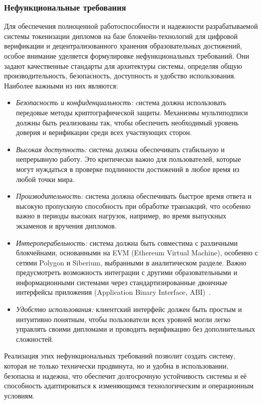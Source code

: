 \subsubsection{Нефункциональные требования}
\label{subsec:nonfunc_req}

Для обеспечения полноценной работоспособности и надежности разрабатываемой системы токенизации дипломов на базе блокчейн-технологий для цифровой верификации и децентрализованного хранения образовательных достижений, особое внимание уделяется формулировке нефункциональных требований. Они задают качественные стандарты для архитектуры системы, определяя общую производительность, безопасность, доступность и удобство использования. Наиболее важными из них являются:

\begin{itemize}
    \item \textit{Безопасность и конфиденциальность:} cистема должна использовать передовые методы криптографической защиты. Механизмы мультиподписи должны быть реализованы так, чтобы обеспечить необходимый уровень доверия и верификации среди всех участвующих сторон.
    \item \textit{Высокая доступность:} система должна обеспечивать стабильную и непрерывную работу. Это критически важно для пользователей, которые могут нуждаться в проверке подлинности достижений в любое время из любой точки мира.
    \item \textit{Производительность:} система должна обеспечивать быстрое время ответа и высокую пропускную способность при обработке транзакций, что особенно важно в периоды высоких нагрузок, например, во время выпускных экзаменов и вручения дипломов.
    \item \textit{Интероперабельность:} система должна быть совместима с различными блокчейнами, основанными на EVM (Ethereum Virtual Machine), особенно с сетями Polygon и Siberium, выбранными в аналитическом разделе. Важно предусмотреть возможность интеграции с другими образовательными и информационными системами через стандартизированные двоичные интерфейсы приложения (Application Binary Interface, ABI)~\cite{bib:sc_abi}.
    \item \textit{Удобство использования:} клиентский интерфейс должен быть простым и интуитивно понятным, чтобы пользователи всех уровней могли легко управлять своими дипломами и проводить верификацию без дополнительных сложностей.
\end{itemize}

Реализация этих нефункциональных требований позволит создать систему, которая не только технически продвинута, но и удобна в использовании, безопасна и надежна, что обеспечит долгосрочную устойчивость системы и её способность адаптироваться к изменяющимся технологическим и операционным условиям.

